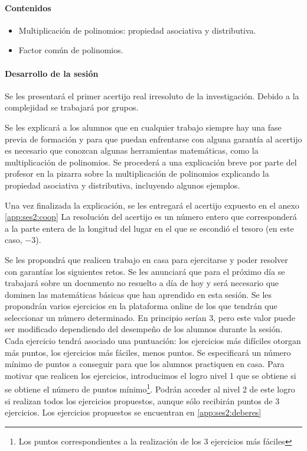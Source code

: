 \paragraph{Contenidos}
\begin{itemize}
	\item Multiplicación de polinomios: propiedad asociativa y distributiva.
	\item Factor común de polinomios.
\end{itemize}

\paragraph{Desarrollo de la sesión}

Se les presentará el primer acertijo real irresoluto de la investigación.
%
Debido a la complejidad se trabajará por grupos.

Se les explicará a los alumnos que en cualquier trabajo siempre hay una fase previa de formación y para que puedan enfrentarse con alguna garantía al acertijo es necesario que conozcan algunas herramientas matemáticas, como la multiplicación de polinomios.
%
Se procederá a una explicación breve por parte del profesor en la pizarra sobre la multiplicación de polinomios explicando la propiedad asociativa y distributiva, incluyendo algunos ejemplos.

Una vez finalizada la explicación, se les entregará el acertijo expuesto en el anexo \ref{app:ses2:coop}
%
La resolución del acertijo es un número entero que corresponderá a la parte entera de la longitud del lugar en el que se escondió el tesoro (en este caso, $-3$).



Se les propondrá que realicen trabajo en casa para ejercitarse y poder resolver con garantías los siguientes retos.
%
Se les anunciará que para el próximo día se trabajará sobre un documento no resuelto a día de hoy y será necesario que dominen las matemáticas básicas que han aprendido en esta sesión.
%
Se les propondrán varios ejercicios en la plataforma online de los que tendrán que seleccionar un número determinado. 
%
En principio serían 3, pero este valor puede ser modificado dependiendo del desempeño de los alumnos durante la sesión.
%
Cada ejercicio tendrá asociado una puntuación: los ejercicios más difíciles otorgan más puntos, los ejercicios más fáciles, menos puntos.
%
Se especificará un número mínimo de puntos a conseguir para que los alumnos practiquen en casa. 
%
Para motivar que realicen los ejercicios, introducimos el logro  nivel 1 que se obtiene si se obtiene el número de puntos mínimo\footnote{Los puntos correspondientes a la realización de los 3 ejercicios más fáciles}.
%
Podrán acceder al nivel 2 de este logro si realizan todos los ejercicios propuestos, aunque sólo recibirán puntos de 3 ejercicios.
%
Los ejercicios propuestos se encuentran en \ref{app:ses2:deberes}

